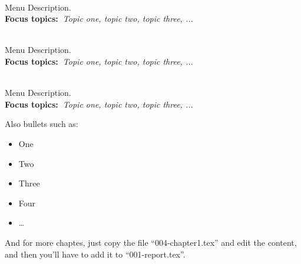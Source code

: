   \begin{description}\addtolength{\itemsep}{-0.35\baselineskip}%
    \item[\textbullet~\bfseries Menu Item] \hfill \\%
      Menu Description.~\\%
      {\textbf{Focus topics:~}\emph{Topic one, topic two, topic three, ...}}%
    \item[\textbullet~\bfseries Menu Item] \hfill \\%
      Menu Description.~\\%
      {\textbf{Focus topics:~}\emph{Topic one, topic two, topic three, ...}}%
    \item[\textbullet~\bfseries Menu Item] \hfill \\%
      Menu Description.~\\%
      {\textbf{Focus topics:~}\emph{Topic one, topic two, topic three, ...}}%
  \end{description}

  Also bullets such as:%
  \begin{itemize}\addtolength{\itemsep}{-0.35\baselineskip}%
    \item One%
    \item Two%
    \item Three%
    \item Four%
    \item \ldots%
  \end{itemize}%

  And for more chaptes, just copy the file ``004-chapter1.tex'' and edit the content, and then you'll have to add it to ``001-report.tex''.
